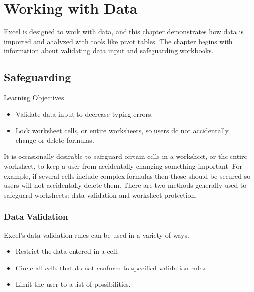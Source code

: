 \chapter{Working with Data}\label{ch07:data}

Excel is designed to work with data, and this chapter demonstrates how data is imported and analyzed with tools like pivot tables. The chapter begins with information about validating data input and safeguarding workbooks. 

\section{Safeguarding}

\begin{center}
	\begin{objbox}{Learning Objectives}
		\begin{itemize}
			\setlength{\itemsep}{0pt}
			\setlength{\parskip}{0pt}
			\setlength{\parsep}{0pt}
			
			\item Validate data input to decrease typing errors.
			\item Lock worksheet cells, or entire worksheets, so users do not accidentally change or delete formulas.
			
		\end{itemize}
	\end{objbox}
\end{center}

It is occasionally desirable to safeguard certain cells in a worksheet, or the entire worksheet, to keep a user from accidentally changing something important. For example, if several cells include complex formulas then those should be secured so users will not accidentally delete them. There are two methods generally used to safeguard worksheets: data validation and worksheet protection. 

\subsection{Data Validation}

Excel's data validation rules can be used in a variety of ways.

\begin{itemize}
	\item Restrict the data entered in a cell.
	\item Circle all cells that do not conform to specified validation rules.
	\item Limit the user to a list of possibilities.
\end{itemize}


